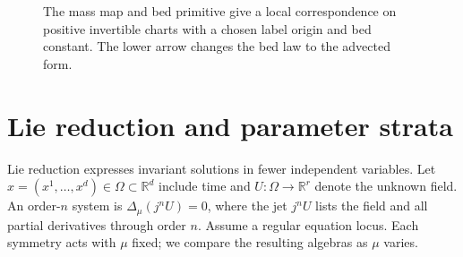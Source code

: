 \documentclass[12pt,a4paper,oneside]{report}
\numberwithin{equation}{chapter}
\theoremstyle{definition}
\theoremstyle{remark}\newtheorem{remark}[theorem]{Remark}
\newif\ifreviewmarks
\DeclareRobustCommand{\review}[1]{{\ifreviewmarks\color{authorblue}\fi #1}}
\begin{document}
\begin{figure}[!ht]\centering
{}
\caption[Eulerian and material bed laws]{The mass map and bed primitive give a local correspondence on positive invertible charts with a chosen label origin and bed constant. The lower arrow changes the bed law to the advected form.}
\label{fig:material-chart}
\end{figure}

\section{Lie reduction and parameter strata}\label{ch:lie}\label{sec:lie-tools}
\review{Lie reduction expresses invariant solutions in fewer independent variables. Let $x=(x^1,\ldots,x^d)\in\Omega\subset\mathbb R^d$ include time and $U:\Omega\to\mathbb R^r$ denote the unknown field. An order-$n$ system is $\Delta_\mu(j^nU)=0$, where the jet $j^nU$ lists the field and all partial derivatives through order $n$. Assume a regular equation locus. Each symmetry acts with $\mu$ fixed; we compare the resulting algebras as $\mu$ varies.}
\end{document}
